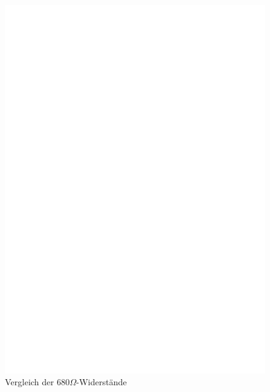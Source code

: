 \begin{enumerate}
\begin{figure}[H]
\centering
\includegraphics[width=17cm]{../FIG/Test2.eps}
\caption{Vergleich der \(680\Omega\)-Widerst\"ande }
\label{fig:test2}
\end{figure}


\end{enumerate}
